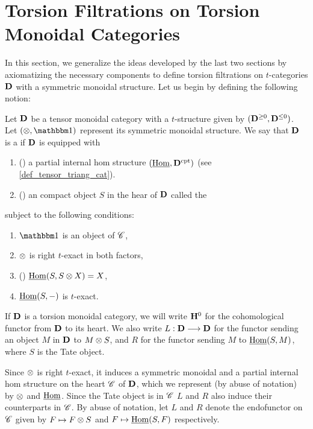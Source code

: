 \newpage
\section{Torsion Filtrations on Torsion Monoidal Categories}
\label{sect_filtration_general}

In this section, we generalize the ideas developed by the last
two sections by axiomatizing the necessary components to define
torsion filtrations on $t$-categories $\mathbf{D}$ with a symmetric
monoidal structure. Let us begin by defining the following notion:

\begin{defn}\label{def_torsion_monoidal_category}
Let $\mathbf{D}$ be a tensor monoidal category with a $t$-structure 
given by $(\mathbf{D}^{\geq 0}, \mathbf{D}^{\leq 0})$. Let 
$(\tensor, \Unit)$ represent its symmetric monoidal structure. We 
say that $\mathbf{D}$ is a  if $\mathbf{D}$ 
is equipped with 
\begin{enumerate}
\item () a partial internal hom
structure $(\underline{\mathrm{Hom}}, \mathbf{D}^{\mathrm{cpt}})$ (see 
\ref{def_tensor_triang_cat}).

\item () an compact object $S$ in the hear
   of $\mathbf{D}$ called the 
\end{enumerate}

\noindent subject to the following conditions:

\begin{enumerate}
\item $\Unit$ is an object of $\mathscr{C}$,

\item $\otimes$ is right $t$-exact in both factors,

\item () $\underline{\mathrm{Hom}}(S, S \otimes X) = X$,

\item $\underline{\mathrm{Hom}}(S, -)$ is $t$-exact.
\end{enumerate}
\end{defn}

If $\mathbf{D}$ is a torsion monoidal category, we will write $\mathbf{H}^0$
for the cohomological functor from $\mathbf{D}$ to its heart. We also 
write $L: \mathbf{D} \longrightarrow \mathbf{D}$ for the functor sending an object $M$ 
in $\mathbf{D}$ to $M \otimes S$, and $R$ for the functor sending $M$
to $\underline{\mathrm{Hom}}(S, M)$, where $S$ is the Tate object. 

Since $\otimes$ is right $t$-exact, it induces a symmetric 
monoidal and a partial internal hom structure on the heart 
$\mathscr{C}$ of $\mathbf{D}$, which we represent (by abuse of notation)
by $\otimes$ and $\underline{\mathrm{Hom}}$. Since the Tate object is in $\mathscr{C}$
$L$ and $R$ also induce their counterparts in $\mathscr{C}$. By
abuse of notation, let $L$ and $R$ denote the endofunctor on 
$\mathscr{C}$ given by $F \mapsto F \otimes S$ and $F \mapsto
\underline{\mathrm{Hom}}(S, F)$ respectively.

